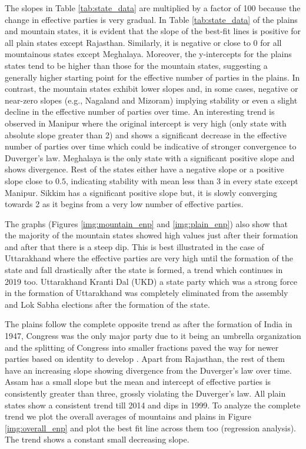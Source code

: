 The slopes in Table \ref{tab:state_data} are multiplied by a factor of 100 because the change in effective parties is very gradual. In Table \ref{tab:state_data} of the plains and mountain states, it is evident that the slope of the best-fit lines is positive for all plain states except Rajasthan. Similarly, it is negative or close to 0 for all mountainous states except Meghalaya. Moreover, the y-intercepts for the plains states tend to be higher than those for the mountain states, suggesting a generally higher starting point for the effective number of parties in the plains. In contrast, the mountain states exhibit lower slopes and, in some cases, negative or near-zero slopes (e.g., Nagaland and Mizoram) implying stability or even a slight decline in the effective number of parties over time.  An interesting trend is observed in Manipur where the original intercept is very high (only state with absolute slope greater than 2) and shows a significant decrease in the effective number of parties over time which could be indicative of stronger convergence to Duverger’s law. Meghalaya is the only state with a significant positive slope and shows divergence. Rest of the states either have a negative slope or a positive slope close to $0.5$, indicating stability with mean less than 3 in every state except Manipur. Sikkim has a significant positive slope but, it is slowly converging towards 2 as it begins from a very low number of effective parties.

\vspace{0.3cm}

The graphs (Figures \ref{img:mountain_enp} and \ref{img:plain_enp}) also show that the majority of the mountain states showed high values just after their formation and after that there is a steep dip. This is best illustrated in the case of Uttarakhand where the effective parties are very high until the formation of the state and fall drastically after the state is formed, a trend which continues in 2019 too. Uttarakhand Kranti Dal (UKD) a state party which was a strong force in the formation of Uttarakhand was completely eliminated from the assembly and Lok Sabha elections after the formation of the state.  

\vspace{0.3cm}

The plains follow the complete opposite trend as after the formation of India in 1947, Congress was the only major party due to it being an umbrella organization and the splitting of Congress into smaller fractions paved the way for newer parties based on identity to develop \citep{kothari1967india}. Apart from Rajasthan, the rest of them have an increasing slope showing divergence from the Duverger’s law over time. Assam has a small slope but the mean and intercept of effective parties is consistently greater than three, grossly violating the Duverger’s law. All plain states show a consistent trend till 2014 and dips in 1999. To analyze the complete trend we plot the overall averages of mountains and plains in Figure \ref{img:overall_enp} and plot the best fit line across them too (regression analysis). The trend shows a constant small decreasing slope.

